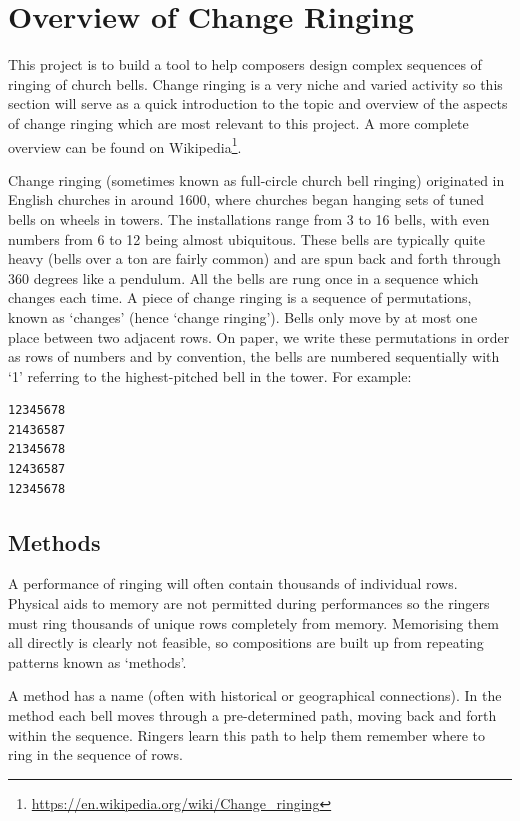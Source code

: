\documentclass[12pt]{article}
\newcommand{\br}[0]{\vspace{10pt} \noindent}
\newcommand{\footurl}[1]{\footnote{\url{#1}}}
\begin{document}
\section{Overview of Change Ringing}

This project is to build a tool to help composers design complex sequences of ringing of church
bells.  Change ringing is a very niche and varied activity so this section will serve as a quick
introduction to the topic and overview of the aspects of change ringing which are most relevant to
this project.  A more complete overview can be found
on Wikipedia\footurl{https://en.wikipedia.org/wiki/Change_ringing}.

\br{}Change ringing (sometimes known as full-circle church bell ringing) originated in English
churches in around 1600, where churches began hanging sets of tuned bells on wheels in towers.
The installations range from 3 to 16 bells, with even numbers from 6 to 12 being almost ubiquitous.
These bells are typically quite heavy (bells over a ton are fairly common) and are spun
back and forth through 360 degrees like a pendulum.  All the bells are rung once in a sequence which
changes each time.  A piece of change ringing is a sequence of permutations, known as `changes'
(hence `change ringing').  Bells only move by at most one place between two adjacent rows.  On
paper, we write these permutations in order as rows of numbers and by convention, the bells
are numbered sequentially with `1' referring to the highest-pitched bell in the tower.  For
example:

\begin{verbatim}
12345678
21436587
21345678
12436587
12345678
\end{verbatim}

\subsection{Methods}
A performance of ringing will often contain thousands of individual rows.  Physical aids to memory
are not permitted during performances so the ringers must ring thousands of unique rows completely
from memory.  Memorising them all directly is clearly not feasible, so compositions are built up
from repeating patterns known as `methods'.

A method has a name (often with historical or geographical connections). In the method each bell
moves through a pre-determined path, moving back and forth within the sequence. Ringers learn this
path to help them remember where to ring in the sequence of rows.
\end{document}
